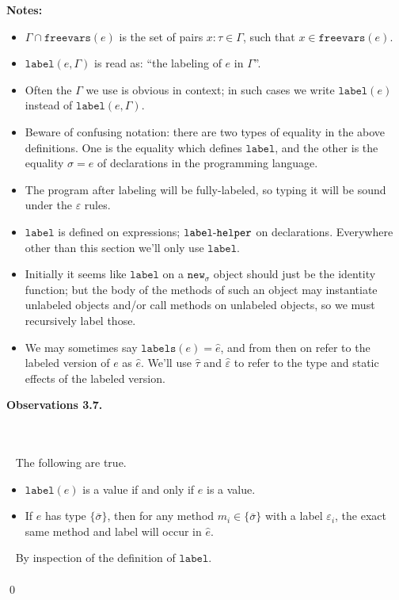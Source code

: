 \documentclass{llncs}
\newcommand{\keywadj}[1]{\mathtt{#1}}
\newcommand{\kwa}[1]{\keywadj{ #1 }}
\newcommand{\hyphen}{\hbox{-}}
\newcommand{\thm}[3]{
	\begin{large}
		\bf{#1}
	\end{large} \\\\
	\fbox{Statement.} ~ #2
	\fbox{Proof.}~ #3 \qed
}
\begin{document}
\noindent \textbf{Notes:}
\begin{itemize}
\item $\Gamma \cap \keywadj{freevars}(e)$ is the set of pairs $x : \tau \in \Gamma$, such that $x \in \keywadj{freevars}(e)$.
\item $\keywadj{label}(e, \Gamma)$ is read as: ``the labeling of $e$ in $\Gamma$''.
\item Often the $\Gamma$ we use is obvious in context; in such cases we write $\kwa{label}(e)$ instead of $\kwa{label}(e, \Gamma)$.
\item Beware of confusing notation: there are two types of equality in the above definitions. One is the equality which defines $\keywadj{label}$, and the other is the equality $\sigma = e$ of declarations in the programming language.
\item The program after labeling will be fully-labeled, so typing it will be sound under the $\varepsilon$ rules.
\item $\keywadj{label}$ is defined on expressions; $\keywadj{label \hyphen helper}$ on declarations. Everywhere other than this section we'll only use $\keywadj{label}$.
\item Initially it seems like $\keywadj{label}$ on a $\keywadj{new_\sigma}$ object should just be the identity function; but the body of the methods of such an object may instantiate unlabeled objects and/or call methods on unlabeled objects, so we must recursively label those.
\item We may sometimes say $\keywadj{labels}(e) = \hat e$, and from then on refer to the labeled version of $e$ as $\hat e$. We'll use $\hat \tau$ and $\hat \varepsilon$ to refer to the type and static effects of the labeled version.\\
\end{itemize}






\noindent
\thm{Observations 3.7.}
{The following are true.
\begin{itemize}
	\item $\keywadj{label}(e)$ is a value if and only if $e$ is a value.
	\item If $e$ has type $\{ \bar \sigma \}$, then for any method $m_i \in \{ \bar \sigma \}$ with a label $\varepsilon_i$, the exact same method and label will occur in $\hat e$.
\end{itemize}}
{By inspection of the definition of $\keywadj{label}$.\\\\}
\end{document}
